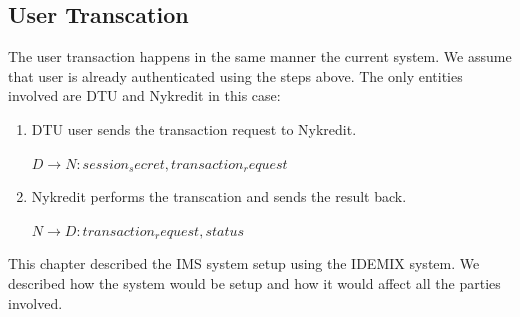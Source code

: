 \subsection{User Transcation}
The user transaction happens in the same manner the current system. We assume that user is already authenticated using the steps above. The only entities involved are DTU and Nykredit in this case:
\begin{enumerate}
\item DTU user sends the transaction request to Nykredit.
	\begin{center}
		$D \rightarrow N : {session_secret,transaction_request}$
	\end{center}
\item Nykredit performs the transcation and sends the result back.
	\begin{center}
		$N \rightarrow D : {transaction_request,status}$
	\end{center}
\end{enumerate}


This chapter described the IMS system setup using the IDEMIX system. We described how the system would be setup and how it would affect all the parties involved.


